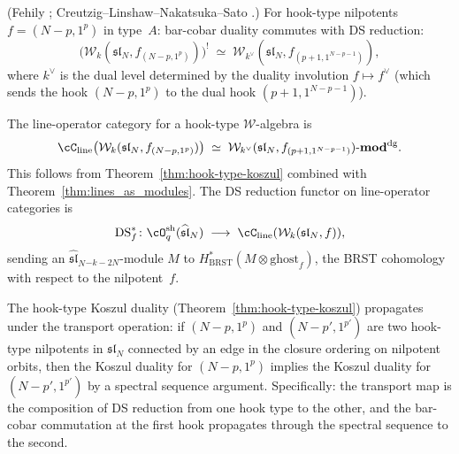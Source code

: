 \begin{theorem}
\textup{(Fehily \cite{Feh23}; Creutzig--Linshaw--Nakatsuka--Sato
\cite{CLNS25}.)}
For hook-type nilpotents $f=(N-p,1^p)$ in type~$A$:
bar-cobar duality commutes with DS reduction:
\begin{equation}
\bigl(\mathcal{W}_k(\mathfrak{sl}_N,f_{(N-p,1^p)})\bigr)^!
\;\simeq\;
\mathcal{W}_{k^\vee}(\mathfrak{sl}_N,f_{(p+1,1^{N-p-1})}),
\end{equation}
where $k^\vee$ is the dual level determined by the duality
involution $f\mapsto f^\vee$ (which sends the hook
$(N-p,1^p)$ to the dual hook $(p+1,1^{N-p-1})$).
\end{theorem}

\begin{construction}
The line-operator category for a hook-type
$\mathcal{W}$-algebra is
\begin{equation}
\cC_{\mathrm{line}}
\bigl(\mathcal{W}_k(\mathfrak{sl}_N,f_{(N-p,1^p)})\bigr)
\;\simeq\;
\mathcal{W}_{k^\vee}(\mathfrak{sl}_N,f_{(p+1,1^{N-p-1})})
\text{-}\mathbf{mod}^{\mathrm{dg}}.
\end{equation}
This follows from Theorem~\ref{thm:hook-type-koszul}
combined with Theorem~\ref{thm:lines_as_modules}.
The DS reduction functor on line-operator categories
is
\begin{equation}
\mathrm{DS}_{f}^*\colon
\cO_q^{\mathrm{sh}}(\widehat{\mathfrak{sl}}_N)
\;\longrightarrow\;
\cC_{\mathrm{line}}
(\mathcal{W}_k(\mathfrak{sl}_N,f)),
\end{equation}
sending an $\widehat{\mathfrak{sl}}_N{}_{-k-2N}$-module
$M$ to $H^*_{\mathrm{BRST}}(M\otimes\mathrm{ghost}_f)$,
the BRST cohomology with respect to the nilpotent~$f$.
\end{construction}

\begin{proposition}
The hook-type Koszul duality
(Theorem~\textup{\ref{thm:hook-type-koszul}}) propagates under
the transport operation: if $(N-p,1^p)$ and $(N-p',1^{p'})$
are two hook-type nilpotents in $\mathfrak{sl}_N$ connected
by an edge in the closure ordering on nilpotent orbits, then
the Koszul duality for $(N-p,1^p)$ implies the Koszul
duality for $(N-p',1^{p'})$ by a spectral sequence argument.
Specifically: the transport map is the composition of
DS reduction from one hook type to the other, and the bar-cobar
commutation at the first hook propagates through the spectral
sequence to the second.
\end{proposition}

